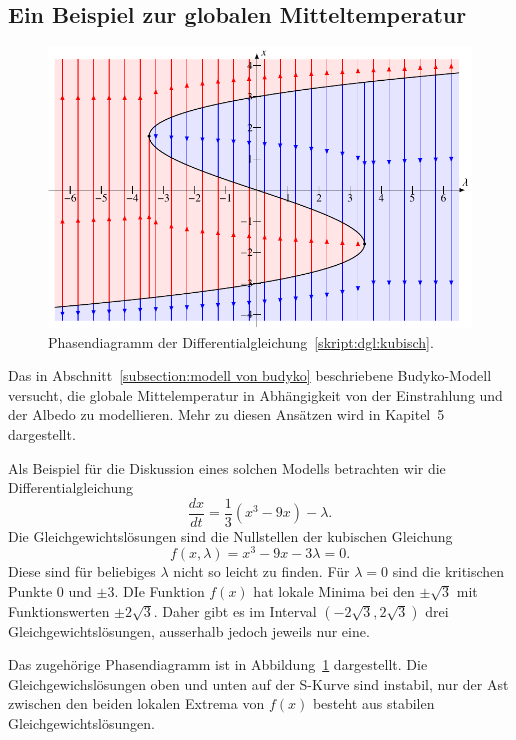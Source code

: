 \subsection{Ein Beispiel zur globalen Mitteltemperatur\label{subsection:budyko}}
\begin{figure}
\includegraphics{chapters/3/kubisch.pdf}
\caption{Phasendiagramm der Differentialgleichung~\eqref{skript:dgl:kubisch}.
\label{skript:dgl:kubischfig}}
\end{figure}
Das in Abschnitt~\ref{subsection:modell von budyko} beschriebene
Budyko-Modell versucht, die globale Mittelemperatur in Abhängigkeit
von der Einstrahlung und der Albedo zu modellieren.
Mehr zu diesen Ansätzen wird in Kapitel~5 dargestellt.

Als Beispiel für die Diskussion eines solchen Modells betrachten wir
die Differentialgleichung
\begin{equation}
\frac{dx}{dt}
=
\frac13(x^3 - 9x) - \lambda.
\label{skript:dgl:kubisch}
\end{equation}
Die Gleichgewichtslösungen sind die Nullstellen der kubischen Gleichung
\[
f(x,\lambda)
=
x^3-9x-3\lambda=0.
\]
Diese sind für beliebiges $\lambda$ nicht so leicht zu finden.
Für $\lambda=0$ sind die kritischen Punkte $0$ und $\pm 3$.
DIe Funktion $f(x)$ hat lokale Minima bei den $\pm\sqrt{3}$ mit
Funktionswerten $\pm2\sqrt{3}$.
Daher gibt es im Interval $(-2\sqrt{3},2\sqrt{3})$ drei 
Gleichgewichtslösungen, ausserhalb jedoch jeweils nur eine.

Das zugehörige Phasendiagramm ist in Abbildung~\ref{skript:dgl:kubischfig}
dargestellt.
Die Gleichgewichslösungen oben und unten auf der S-Kurve sind instabil,
nur der Ast zwischen den beiden lokalen Extrema von $f(x)$ besteht
aus stabilen Gleichgewichtslösungen.

